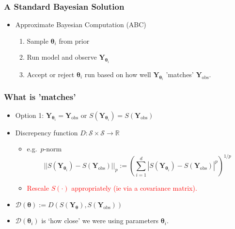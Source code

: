 \documentclass{beamer}
\begin{document}
\begin{frame}
    \frametitle{A Standard Bayesian Solution}
    \begin{itemize}
        \item Approximate Bayesian Computation (ABC)\begin{enumerate}
                  \item Sample $\bm{\theta}_i$ from prior
                  \item Run model and observe $\mathbf{Y}_{\bm{\theta}_i}$
                  \item Accept or reject $\bm{\theta}_i$ run based on how well
                        $\mathbf{Y}_{\bm{\theta}_i}$ 'matches' $\mathbf{Y}_\text{obs}.$
              \end{enumerate}
    \end{itemize}
\end{frame}

\begin{frame}
    \frametitle{What is 'matches'}
    \begin{itemize}
        \item Option 1: $\mathbf{Y}_{\bm{\theta}_i} = \mathbf{Y}_\text{obs}$
              or $S(\mathbf{Y}_{\bm{\theta}_i}) = S(\mathbf{Y}_\text{obs})$
        \item <2-> Discrepency function $D:\mathcal{S}\times \mathcal{S} \to \mathbb{R}$ \begin{itemize}
                  \item e.g.\ $p$-norm
                        $$
                            ||S(\mathbf{Y}_{\bm{\theta}_i}) - S(\mathbf{Y}_\text{obs})||_p
                            :=(\sum_{i = 1}^d|S(\mathbf{Y}_{\bm{\theta}_i})
                            - S(\mathbf{Y}_\text{obs})|^p)^{1/p}
                        $$
                  \item <3-> \textcolor{red}{Rescale $S(\cdot)$ appropriately (ie via a covariance matrix).}
              \end{itemize}
        \item <4-> $\mathcal{D}(\bm{\theta}) := D(S(\mathbf{Y}_{\bm{\theta}}), S(\mathbf{Y}_\text{obs}))$
        \item <5-> $\mathcal{D}(\bm{\theta}_i)$ is `how close' we were using parameters $\bm{\theta}_i.$
    \end{itemize}
\end{frame}
\end{document}
